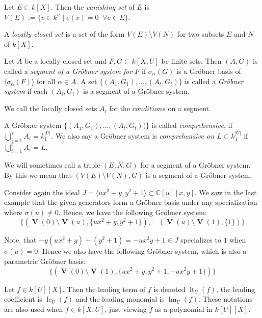 \documentclass[a4paper, 12pt]{article}
\newcommand{\C}{\mathbb{C}}
\DeclareMathOperator{\LT}{lt}
\DeclareMathOperator{\LM}{lm}
\DeclareMathOperator{\LC}{lc}
\DeclareMathOperator{\V}{\mathbf V}
\theoremstyle{changedot}
\theoremstyle{changedotbreak}
\theoremstyle{nonumberplain}
\begin{document}
\begin{definition}
  Let $E \subset k[X]$. Then the \textit{vanishing set} of $E$ is $V(E) := \{v \in k^{n} \mid e(v) = 0 \;\; \forall e \in E\}$.

  A \textit{locally closed set} is a set of the form $V(E) \setminus V(N)$ for two subsets $E$ and $N$ of $k[X]$.
\end{definition}

\begin{definition}
  Let $A$ be a locally closed set and $F, G \subset k[X, U]$ be finite sets. Then $(A, G)$ is called a \textit{segment of a Gröbner system for $F$} if $\sigma_{\alpha}(G)$ is a Gröbner basis of $\langle \sigma_{\alpha}(F) \rangle$ for all $\alpha \in A$. A set $\{(A_{1}, G_{1}), \dots, (A_{t}, G_{t})\}$ is called a \textit{Gröbner system} if each $(A_{i}, G_{i})$ is a segment of a Gröbner system.

  We call the locally closed sets $A_{i}$ for the $\textit{conditions}$ on a segment.

  A Gröbner system $\{(A_{1}, G_{1}), \dots, (A_{t}, G_{t}))\}$ is called \textit{comprehensive}, if $\bigcup_{i=1}^{\,t}A_{i} = k_{1}^{|U|}$. We also say a Gröbner system is \textit{comprehensive on $L \subset k_{1}^{|U|}$} if $\bigcup_{i=1}^{t}A_{i} = L$.
\end{definition}

We will sometimes call a triple $(E, N, G)$ for a segment of a Gröbner system. By this we mean that $(V(E) \setminus V(N), G)$ is a segment of a Gröbner system.

\begin{example}\upshape
  Consider again the ideal $J = \langle ux^{2} + y, y^{2} + 1 \rangle \subset \C[u][x, y]$. We saw in the last example that the given generators form a Gröbner basis under any specialization where $\sigma(u) \neq 0$. Hence, we have the following Gröbner system:
  \[\{(\V(0) \setminus \V(u), \{ux^{2} + y, y^{2} + 1\}), \quad (\V(u) \setminus \V(1), \{1\})\}\]

  Note, that $-y(ux^{2} + y) + (y^{2} + 1) = -ux^{2}y + 1 \in J$ specializes to $1$ when $\sigma(u) = 0$. Hence we also have the following Gröbner system, which is also a parametric Gröbner basis:
  \[\{(\V(0) \setminus \V(1), \{ux^{2} + y, y^{2} + 1, -ux^{2}y + 1\})\}\]
\end{example}

\begin{definition}
  Let $f \in k[U][X]$. Then the leading term of $f$ is denoted $\LT_{U}(f)$, the leading coefficient is $\LC_{U}(f)$ and the leading monomial is $\LM_{U}(f)$. These notations are also used when $f \in k[X, U]$, just viewing $f$ as a polynomial in $k[U][X]$.
\end{definition}
\end{document}
